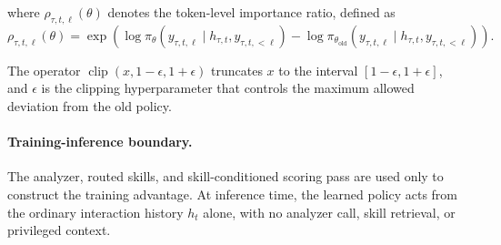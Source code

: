 where \(\rho_{\tau,t,\ell}(\theta)\) denotes the token-level importance ratio, defined as
\begin{equation*}
    \rho_{\tau,t,\ell}(\theta)
    =
    \exp\left(
        \log\pi_{\theta}
        (y_{\tau,t,\ell}\mid h_{\tau,t},y_{\tau,t,<\ell})
        -
        \log\pi_{\theta_{\mathrm{old}}}
        (y_{\tau,t,\ell}\mid h_{\tau,t},y_{\tau,t,<\ell})
    \right).
\end{equation*}

The operator \(\operatorname{clip}(x,1-\epsilon,1+\epsilon)\) truncates \(x\) to the interval
\([1-\epsilon,1+\epsilon]\), and \(\epsilon\) is the clipping hyperparameter that controls the maximum allowed deviation from the old policy.

\paragraph{Training-inference boundary.}
The analyzer, routed skills, and skill-conditioned scoring pass are used only to construct the training advantage. At inference time, the learned policy acts from the ordinary interaction history $h_t$ alone, with no analyzer call, skill retrieval, or privileged context. 